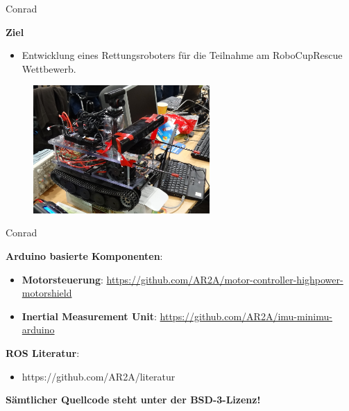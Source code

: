 \documentclass{beamer}
\begin{document}
\begin{frame}{Conrad}
\begin{large}\textbf{Ziel}\end{large}
\begin{itemize}
	\item Entwicklung eines Rettungsroboters f\"ur die Teilnahme am RoboCupRescue Wettbewerb.
\end{itemize}
\begin{figure}[H]
	\centering
	\includegraphics[width=0.6\textwidth]{./images/robot-conrad.jpg}
\end{figure}
\end{frame}
\begin{frame}{Conrad}
\begin{large}\textbf{Arduino basierte Komponenten}:\end{large}
\begin{itemize}
	\item \textbf{Motorsteuerung}: \url{https://github.com/AR2A/motor-controller-highpower-motorshield}
\end{itemize}
\begin{itemize}
	\item \textbf{Inertial Measurement Unit}: \url{https://github.com/AR2A/imu-minimu-arduino}
\end{itemize}
\vspace{20px}
\begin{large}\textbf{ROS Literatur}:\end{large}
\begin{itemize}
	\item https://github.com/AR2A/literatur
\end{itemize}
\vspace{20px}
\begin{large}\textbf{S\"amtlicher Quellcode steht unter der BSD-3-Lizenz!}\end{large}
\end{frame}
\end{document}
